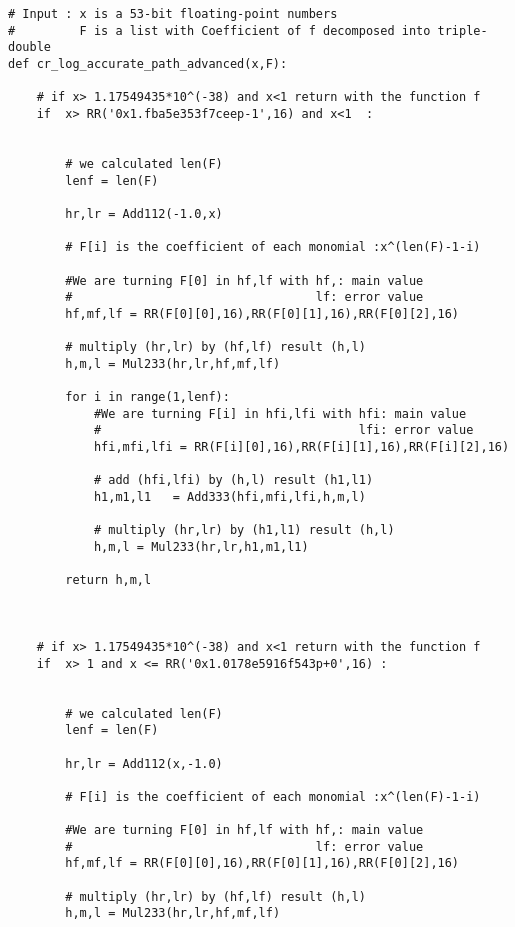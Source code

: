 \begin{lstlisting}
# Input : x is a 53-bit floating-point numbers 
#         F is a list with Coefficient of f decomposed into triple-double 
def cr_log_accurate_path_advanced(x,F):

    # if x> 1.17549435*10^(-38) and x<1 return with the function f 
    if  x> RR('0x1.fba5e353f7ceep-1',16) and x<1  :
       
       
        # we calculated len(F)
        lenf = len(F)
        
        hr,lr = Add112(-1.0,x)
        
        # F[i] is the coefficient of each monomial :x^(len(F)-1-i)
    
        #We are turning F[0] in hf,lf with hf,: main value
        #                                  lf: error value
        hf,mf,lf = RR(F[0][0],16),RR(F[0][1],16),RR(F[0][2],16)

        # multiply (hr,lr) by (hf,lf) result (h,l)
        h,m,l = Mul233(hr,lr,hf,mf,lf)
       
        for i in range(1,lenf):
            #We are turning F[i] in hfi,lfi with hfi: main value
            #                                    lfi: error value
            hfi,mfi,lfi = RR(F[i][0],16),RR(F[i][1],16),RR(F[i][2],16)

            # add (hfi,lfi) by (h,l) result (h1,l1)
            h1,m1,l1   = Add333(hfi,mfi,lfi,h,m,l)

            # multiply (hr,lr) by (h1,l1) result (h,l)
            h,m,l = Mul233(hr,lr,h1,m1,l1)
            
        return h,m,l
    
    
    
    # if x> 1.17549435*10^(-38) and x<1 return with the function f 
    if  x> 1 and x <= RR('0x1.0178e5916f543p+0',16) :
       
       
        # we calculated len(F)
        lenf = len(F)
        
        hr,lr = Add112(x,-1.0)
        
        # F[i] is the coefficient of each monomial :x^(len(F)-1-i)
    
        #We are turning F[0] in hf,lf with hf,: main value
        #                                  lf: error value
        hf,mf,lf = RR(F[0][0],16),RR(F[0][1],16),RR(F[0][2],16)

        # multiply (hr,lr) by (hf,lf) result (h,l)
        h,m,l = Mul233(hr,lr,hf,mf,lf)
        

\end{lstlisting}
